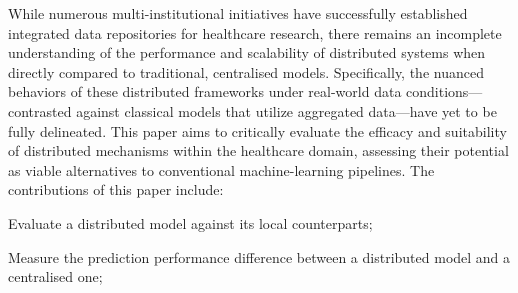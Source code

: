
While numerous multi-institutional initiatives have successfully established integrated data repositories for healthcare research, there remains an incomplete understanding of the performance and scalability of distributed systems when directly compared to traditional, centralised models. Specifically, the nuanced behaviors of these distributed frameworks under real-world data conditions—contrasted against classical models that utilize aggregated data—have yet to be fully delineated. This paper aims to critically evaluate the efficacy and suitability of distributed mechanisms within the healthcare domain, assessing their potential as viable alternatives to conventional machine-learning pipelines. The contributions of this paper include:

\begin{myitemize}
    \item Evaluate a distributed model against its local counterparts;
    \item Measure the prediction performance difference between a distributed model and a centralised one;

\end{myitemize}
